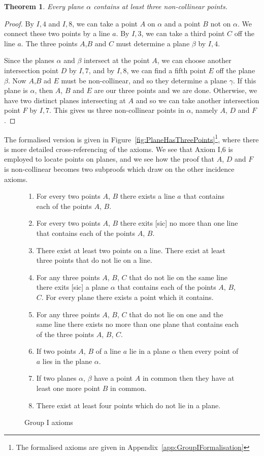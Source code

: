 \documentclass{article}
\newtheorem{theorem}{Theorem}
\begin{document}
\begin{theorem}\label{theorem:PlaneHasThreePoints}
Every plane $\alpha$ contains at least three non-collinear points.
\end{theorem}
\begin{proof}
By $I,4$ and $I,8$, we can take a point $A$ on $\alpha$ and a point $B$ not on $\alpha$. We connect these two points by a line $a$. By $I,3$, we can take a third point $C$ off the line $a$. The three points $A$,$B$ and $C$ must determine a plane $\beta$ by $I,4$. 

Since the planes $\alpha$ and $\beta$ intersect at the point $A$, we can choose another intersection point $D$ by $I,7$, and by $I,8$, we can find a fifth point $E$ off the plane $\beta$. Now $A$,$B$ ad $E$ must be non-collinear, and so they determine a plane $\gamma$. If this plane is $\alpha$, then $A$, $B$ and $E$ are our three points and we are done. Otherwise, we have two distinct planes intersecting at $A$ and so we can take another intersection point $F$ by $I,7$. This gives us three non-collinear points in $\alpha$, namely $A$, $D$ and $F$.
\end{proof}

The formalised version is given in Figure~\ref{fig:PlaneHasThreePoints}\footnote{The formalised axioms are given in Appendix~\ref{app:GroupIFormalisation}}, where there is more detailed cross-referencing of the axioms. We see that Axiom I,6 is employed to locate points on planes, and we see how the proof that $A$, $D$ and $F$ is non-collinear becomes two subproofs which draw on the other incidence axioms.

\begin{figure}
  \begin{enumerate}
  \item[I,1] For every two points $A$, $B$ there exists a line $a$ that contains each of the points $A$, $B$.
  \item[I,2] For every two points $A$, $B$ there exits [sic] no more than one line that contains each of the points $A$, $B$.
  \item[I,3] There exist at least two points on a line. There exist at least three points that do not lie on a line.
  \item[I,4] For any three points $A$, $B$, $C$ that do not lie on the same line there exits [sic] a plane $\alpha$ that contains each of the points $A$, $B$, $C$. For every plane there exists a point which it contains.
  \item[I,5] For any three points $A$, $B$, $C$ that do not lie on one and the same line there exists no more than one plane that contains each of the three points $A$, $B$, $C$.
  \item[I,6] If two points $A$, $B$ of a line $a$ lie in a plane $\alpha$ then every point of $a$ lies in the plane $\alpha$.
  \item[I,7] If two planes $\alpha$, $\beta$ have a point $A$ in common then they have at least one more point $B$ in common.
  \item[I,8] There exist at least four points which do not lie in a plane.
  \end{enumerate}
  \caption{Group I axioms}
  \label{fig:GroupI}
\end{figure}
\end{document}

